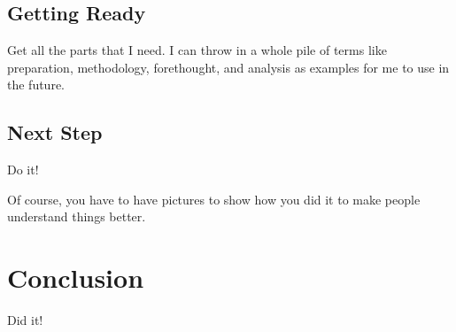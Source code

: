 \documentclass[12pt]{dalthesis}
\begin{document}
\section{Getting Ready}

Get all the parts that I need.  I can throw in a whole pile of terms like
preparation,
methodology,
forethought,
and
analysis
as examples for me to use in the future.

\section{Next Step}

Do it!

Of course, you have to have pictures to show how you did it to make people
understand things better.

\chapter{Conclusion}

Did it!



\end{document}
